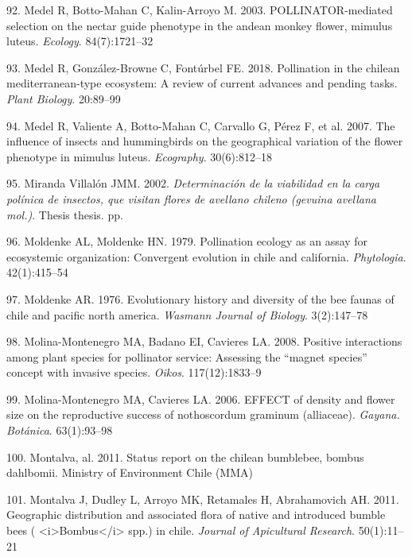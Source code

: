 \documentclass[
]{article}
\begin{document}
\leavevmode\hypertarget{ref-RN134}{}%
92. Medel R, Botto-Mahan C, Kalin-Arroyo M. 2003. POLLINATOR-mediated
selection on the nectar guide phenotype in the andean monkey flower,
mimulus luteus. \emph{Ecology}. 84(7):1721--32

\leavevmode\hypertarget{ref-RN51}{}%
93. Medel R, González-Browne C, Fontúrbel FE. 2018. Pollination in the
chilean mediterranean-type ecosystem: A review of current advances and
pending tasks. \emph{Plant Biology}. 20:89--99

\leavevmode\hypertarget{ref-RN135}{}%
94. Medel R, Valiente A, Botto-Mahan C, Carvallo G, Pérez F, et al.
2007. The influence of insects and hummingbirds on the geographical
variation of the flower phenotype in mimulus luteus. \emph{Ecography}.
30(6):812--18

\leavevmode\hypertarget{ref-RN52}{}%
95. Miranda Villalón JMM. 2002. \emph{Determinación de la viabilidad en
la carga polínica de insectos, que visitan flores de avellano chileno
(gevuina avellana mol.)}. Thesis thesis. pp.

\leavevmode\hypertarget{ref-RN100}{}%
96. Moldenke AL, Moldenke HN. 1979. Pollination ecology as an assay for
ecosystemic organization: Convergent evolution in chile and california.
\emph{Phytologia}. 42(1):415--54

\leavevmode\hypertarget{ref-RN94}{}%
97. Moldenke AR. 1976. Evolutionary history and diversity of the bee
faunas of chile and pacific north america. \emph{Wasmann Journal of
Biology}. 3(2):147--78

\leavevmode\hypertarget{ref-RN137}{}%
98. Molina-Montenegro MA, Badano EI, Cavieres LA. 2008. Positive
interactions among plant species for pollinator service: Assessing the
``magnet species'' concept with invasive species. \emph{Oikos}.
117(12):1833--9

\leavevmode\hypertarget{ref-RN136}{}%
99. Molina-Montenegro MA, Cavieres LA. 2006. EFFECT of density and
flower size on the reproductive success of nothoscordum graminum
(alliaceae). \emph{Gayana. Botánica}. 63(1):93--98

\leavevmode\hypertarget{ref-RN173}{}%
100. Montalva, al. 2011. Status report on the chilean bumblebee, bombus
dahlbomii. Ministry of Environment Chile (MMA)

\leavevmode\hypertarget{ref-RN53}{}%
101. Montalva J, Dudley L, Arroyo MK, Retamales H, Abrahamovich AH.
2011. Geographic distribution and associated flora of native and
introduced bumble bees (
\textless i\textgreater Bombus\textless/i\textgreater{} spp.) in chile.
\emph{Journal of Apicultural Research}. 50(1):11--21
\end{document}
